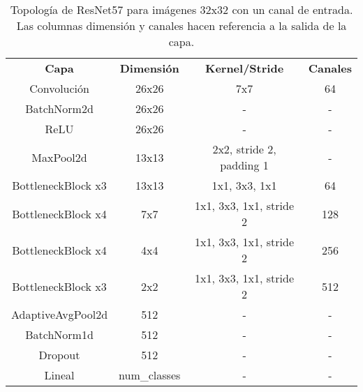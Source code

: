 \begin{table}[]
\begin{tabular}{|c|c|c|c|}
\hline
\multirow{2}{*}{\textbf{Capa}} & \multirow{2}{*}{\textbf{Dimensión}} & \multirow{2}{*}{\textbf{Kernel/Stride}} & \multirow{2}{*}{\textbf{Canales}} \\
                               &                                            &                                         &                                          \\ \hline
Convolución                    & 26x26                                      & 7x7                                     & 64                                       \\ \hline
BatchNorm2d                    & 26x26                                      & -                                       & -                                        \\ \hline
ReLU                           & 26x26                                      & -                                       & -                                        \\ \hline
MaxPool2d                      & 13x13                                      & 2x2, stride 2, padding 1                & -                                        \\ \hline
BottleneckBlock x3             & 13x13                                      & 1x1, 3x3, 1x1                           & 64                                       \\ \hline
BottleneckBlock x4             & 7x7                                        & 1x1, 3x3, 1x1, stride 2                 & 128                                      \\ \hline
BottleneckBlock x4             & 4x4                                        & 1x1, 3x3, 1x1, stride 2                 & 256                                      \\ \hline
BottleneckBlock x3             & 2x2                                        & 1x1, 3x3, 1x1, stride 2                 & 512                                      \\ \hline
AdaptiveAvgPool2d              & 512                                        & -                                       & -                                        \\ \hline
BatchNorm1d                    & 512                                        & -                                       & -                                        \\ \hline
Dropout                        & 512                                        & -                                       & -                                        \\ \hline
Lineal                         & num\_classes                               & -                                       & -                                        \\ \hline
\end{tabular}
\caption{Topología de ResNet57 para imágenes 32x32 con un canal de entrada. Las columnas dimensión y canales hacen referencia a la salida de la capa.}
\label{table:resnet57}
\end{table}


